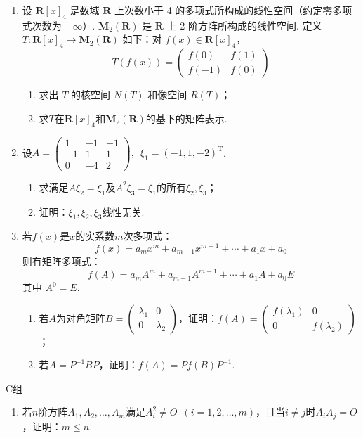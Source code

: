 \begin{enumerate}
    \item 设 $\mathbf{R}[x]_4$ 是数域 $\mathbf{R}$ 上次数小于 4 的多项式所构成的线性空间（约定零多项式次数为 $-\infty$）. $\mathbf{M}_2(\mathbf{R})$ 是 $\mathbf{R}$ 上 2 阶方阵所构成的线性空间. 定义 $T : \mathbf{R}[x]_4 \to \mathbf{M}_2(\mathbf{R})$ 如下：对 $f(x) \in \mathbf{R}[x]_4$，
          \[T(f(x))=\begin{pmatrix}f(0) & f(1) \\ f(-1) & f(0)\end{pmatrix}\]
          \begin{enumerate}
              \item 求出 $T$ 的核空间 $N(T)$ 和像空间 $R(T)$；

              \item 求$T$在$\mathbf{R}[x]_4$和$\mathbf{M}_2(\mathbf{R})$的基下的矩阵表示.
          \end{enumerate}

    \item 设$A=\begin{pmatrix}
                  1 & -1 & -1 \\ -1 & 1 & 1 \\ 0 & -4 & 2
              \end{pmatrix},\enspace\xi_1=(-1,1,-2)^\mathrm{T}$.
          \begin{enumerate}
              \item 求满足$A\xi_2=\xi_1$及$A^2\xi_3=\xi_1$的所有$\xi_2,\xi_3$；

              \item 证明：$\xi_1,\xi_2,\xi_3$线性无关.
          \end{enumerate}

    \item 若$f(x)$是$x$的实系数$m$次多项式：
          \[f(x)=a_mx^m+a_{m-1}x^{m-1}+\cdots+a_1x+a_0\]
          则有矩阵多项式：
          \[f(A)=a_mA^m+a_{m-1}A^{m-1}+\cdots+a_1A+a_0E\]
          其中 $A^0=E$.
          \begin{enumerate}
              \item 若$A$为对角矩阵$B=\begin{pmatrix}
                            \lambda_1 & 0 \\ 0 & \lambda_2
                        \end{pmatrix}$，证明：$f(A)=\begin{pmatrix}
                            f(\lambda_1) & 0 \\ 0 & f(\lambda_2)
                        \end{pmatrix}$；

              \item 若$A=P^{-1}BP$，证明：$f(A)=Pf(B)P^{-1}$.
          \end{enumerate}
\end{enumerate}

\centerline{\heiti C组}
\begin{enumerate}
    \item 若$n$阶方阵$A_1,A_2,\ldots,A_m$满足$A_i^2\neq O\enspace(i=1,2,\ldots,m)$，且当$i\neq j$时$A_iA_j=O$，证明：$m\leqslant n$.
\end{enumerate}
